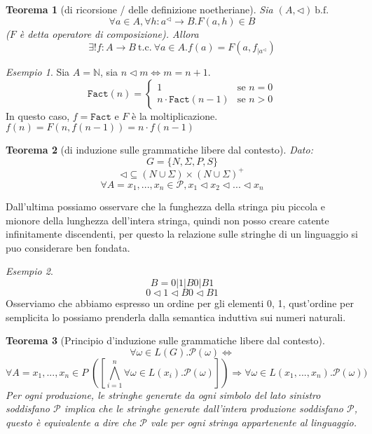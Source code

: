 \documentclass[a4paper]{report}
\newcommand{\bnfn}{\ \mathrm{b.f.}\ }
\newcommand{\tc}{\ \mathrm{t.c.}\ }
\newcommand{\prop}{\mathcal{P}}
\theoremstyle{definition} \newtheorem*{defi}{Def}
\theoremstyle{plain} \newtheorem{lemma}{Lemma}
\theoremstyle{plain} \newtheorem{teo}{Teorema}
\theoremstyle{remark} \newtheorem*{es}{Esempio}
\begin{document}
\begin{teo}[di ricorsione / delle definizione noetheriane]
  Sia $(A,\lhd)\bnfn$
  \[
    \forall a \in A, \forall h:a^\lhd \rightarrow B.
    F(a,h) \in B
  \]
  ($F$ è detta \emph{operatore di composizione}). Allora
  \[
    \exists! f: A \rightarrow B \tc
    \forall a \in A.f(a)=F(a,f_{|a^\lhd})
  \]
\end{teo}
\begin{es}
  Sia $A=\mathbb{N}$, sia $n \lhd m \Leftrightarrow m=n+1$.\\
  \[
    \mathtt{Fact}(n)=
    \begin{cases}
      1 & \text{se } n=0\\
      n \cdot \mathtt{Fact}(n-1) & \text{se } n>0
    \end{cases}
  \]
  In questo caso, $f = \mathtt{Fact}$ e $F$ è la moltiplicazione.\\
  $f(n)=F(n,f(n-1))=n \cdot f(n-1)$
\end{es}
\newpage{}
\begin{teo}[di induzione sulle grammatiche libere dal contesto]
  Dato:
  \[
    G = \{N, \Sigma, P, S\}
  \]
  \[
    \lhd \subseteq (N \cup \Sigma) \times (N \cup \Sigma)^+
  \]
  \[
    \forall A = x_1,...,x_n \in \prop, x_1 \lhd x_2 \lhd ... \lhd x_n
  \]
\end{teo}
  Dall'ultima possiamo osservare che la funghezza della stringa piu piccola e mionore della lunghezza dell'intera stringa, quindi non posso creare catente infinitamente discendenti, per questo la relazione sulle stringhe di un linguaggio si puo considerare ben fondata.
\begin{es}
  \[
    B = 0|1|B0|B1
  \]
  \[
    0 \lhd 1 \lhd B0 \lhd B1
  \]
  Osserviamo che abbiamo espresso un ordine per gli elementi 0, 1, qust'ordine per semplicita lo possiamo prenderla dalla semantica induttiva sui numeri naturali.
\end{es}
\begin{teo}[Principio d'induzione sulle grammatiche libere dal contesto]
  \[
    \forall \omega \in L(G).\prop(\omega) \Leftrightarrow
  \]
  \[
    \forall A = x_1,...,x_n \in P \;
      ([\bigwedge_{i=1}^{n} \forall \omega \in L(x_i).\prop(\omega)])
      \Rightarrow \forall \omega \in L(x_1,...,x_n).\prop(\omega))
  \]
  Per ogni produzione, le stringhe generate da ogni simbolo del lato sinistro soddisfano $\prop$ implica che le stringhe generate dall'intera produzione soddisfano $\prop$, questo è equivalente a dire che $\prop$ vale per ogni stringa appartenente al linguaggio.
\end{teo}
\end{document}
